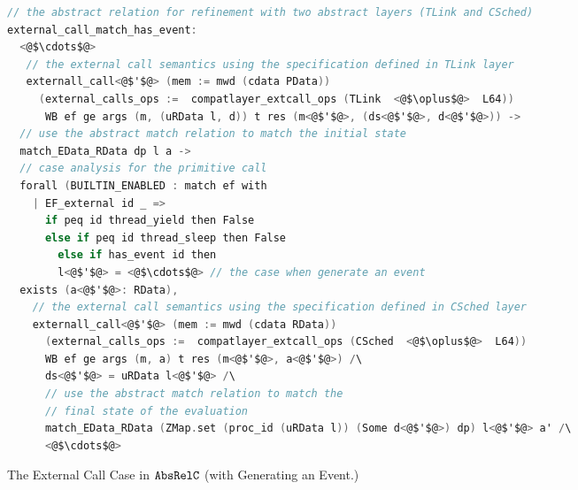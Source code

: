 \begin{figure}
\begin{lstlisting}[language=C]     
// the abstract relation for refinement with two abstract layers (TLink and CSched)
external_call_match_has_event:
  <@$\cdots$@>
   // the external call semantics using the specification defined in TLink layer
   externall_call<@$'$@> (mem := mwd (cdata PData)) 
     (external_calls_ops :=  compatlayer_extcall_ops (TLink  <@$\oplus$@>  L64))
      WB ef ge args (m, (uRData l, d)) t res (m<@$'$@>, (ds<@$'$@>, d<@$'$@>)) ->
  // use the abstract match relation to match the initial state
  match_EData_RData dp l a ->
  // case analysis for the primitive call
  forall (BUILTIN_ENABLED : match ef with
    | EF_external id _ => 
      if peq id thread_yield then False
      else if peq id thread_sleep then False
        else if has_event id then
        l<@$'$@> = <@$\cdots$@> // the case when generate an event   
  exists (a<@$'$@>: RData),
    // the external call semantics using the specification defined in CSched layer  
    externall_call<@$'$@> (mem := mwd (cdata RData)) 
      (external_calls_ops :=  compatlayer_extcall_ops (CSched  <@$\oplus$@>  L64))
      WB ef ge args (m, a) t res (m<@$'$@>, a<@$'$@>) /\
      ds<@$'$@> = uRData l<@$'$@> /\
      // use the abstract match relation to match the 
      // final state of the evaluation
      match_EData_RData (ZMap.set (proc_id (uRData l)) (Some d<@$'$@>) dp) l<@$'$@> a' /\
      <@$\cdots$@>
\end{lstlisting}
\caption{The External Call Case in ${\mathrm{\texttt{AbsRelC}}}$ (with Generating an Event.)}
\label{fig:chapter:conlink:two-cases-of-abs-rel-c}
\end{figure}

